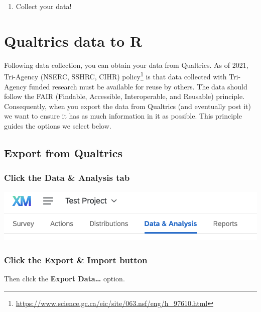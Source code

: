 \documentclass[
]{krantz}
\providecommand{\tightlist}{%
  \setlength{\itemsep}{0pt}\setlength{\parskip}{0pt}}
\renewcommand{\href}[2]{#2\footnote{\url{#1}}}
\begin{document}
\begin{enumerate}
\def\labelenumi{\arabic{enumi}.}
\setcounter{enumi}{4}
\tightlist
\item
  Collect your data!
\end{enumerate}

\hypertarget{qualtrics-data-to-r}{%
\section{Qualtrics data to R}\label{qualtrics-data-to-r}}

Following data collection, you can obtain your data from Qualtrics. As of 2021, Tri-Agency (NSERC, SSHRC, CIHR) \href{https://www.science.gc.ca/eic/site/063.nsf/eng/h_97610.html}{policy} is that data collected with Tri-Agency funded research must be available for reuse by others. The data should follow the FAIR (Findable, Accessible, Interoperable, and Reusable) principle. Consequently, when you export the data from Qualtrics (and eventually post it) we want to ensure it has as much information in it as possible. This principle guides the options we select below.

\hypertarget{export-from-qualtrics}{%
\subsection{Export from Qualtrics}\label{export-from-qualtrics}}

\hypertarget{click-the-data-analysis-tab}{%
\subsubsection{Click the Data \& Analysis tab}\label{click-the-data-analysis-tab}}

\includegraphics[width=0.7\linewidth]{ch_qualtrics/images/screenshot_data}

\hypertarget{click-the-export-import-button}{%
\subsubsection{Click the Export \& Import button}\label{click-the-export-import-button}}

Then click the \textbf{Export Data\ldots{}} option.
\end{document}

